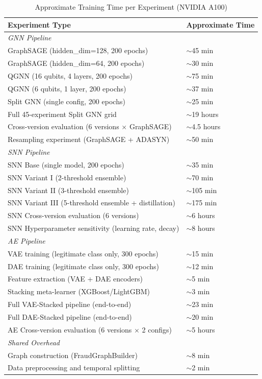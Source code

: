 \begin{table}[H]
\centering
\caption{Approximate Training Time per Experiment (NVIDIA A100)}
\label{tab:repro-time}
\small
\begin{tabularx}{0.9\textwidth}{lX}
\toprule
\textbf{Experiment Type} & \textbf{Approximate Time} \\
\midrule
\multicolumn{2}{l}{\textit{GNN Pipeline}} \\
GraphSAGE (hidden\_dim=128, 200 epochs) & $\sim$45 min \\
GraphSAGE (hidden\_dim=64, 200 epochs) & $\sim$30 min \\
QGNN (16 qubits, 4 layers, 200 epochs) & $\sim$75 min \\
QGNN (6 qubits, 1 layer, 200 epochs) & $\sim$37 min \\
Split GNN (single config, 200 epochs) & $\sim$25 min \\
Full 45-experiment Split GNN grid & $\sim$19 hours \\
Cross-version evaluation (6 versions $\times$ GraphSAGE) & $\sim$4.5 hours \\
Resampling experiment (GraphSAGE + ADASYN) & $\sim$50 min \\
\midrule
\multicolumn{2}{l}{\textit{SNN Pipeline}} \\
SNN Base (single model, 200 epochs) & $\sim$35 min \\
SNN Variant I (2-threshold ensemble) & $\sim$70 min \\
SNN Variant II (3-threshold ensemble) & $\sim$105 min \\
SNN Variant III (5-threshold ensemble + distillation) & $\sim$175 min \\
SNN Cross-version evaluation (6 versions) & $\sim$6 hours \\
SNN Hyperparameter sensitivity (learning rate, decay) & $\sim$8 hours \\
\midrule
\multicolumn{2}{l}{\textit{AE Pipeline}} \\
VAE training (legitimate class only, 300 epochs) & $\sim$15 min \\
DAE training (legitimate class only, 300 epochs) & $\sim$12 min \\
Feature extraction (VAE + DAE encoders) & $\sim$5 min \\
Stacking meta-learner (XGBoost/LightGBM) & $\sim$3 min \\
Full VAE-Stacked pipeline (end-to-end) & $\sim$23 min \\
Full DAE-Stacked pipeline (end-to-end) & $\sim$20 min \\
AE Cross-version evaluation (6 versions $\times$ 2 configs) & $\sim$5 hours \\
\midrule
\multicolumn{2}{l}{\textit{Shared Overhead}} \\
Graph construction (FraudGraphBuilder) & $\sim$8 min \\
Data preprocessing and temporal splitting & $\sim$2 min \\
\bottomrule
\end{tabularx}
\end{table}


